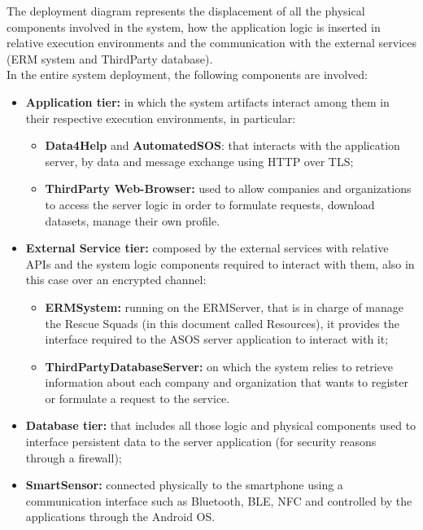 \begin{flushleft}
\newpage
{}
The deployment diagram represents the displacement of all the physical components involved in the system, how the application logic is inserted in relative execution environments and the communication with the external services (ERM system and ThirdParty database). \\
In the entire system deployment, the following components are involved:
\begin{itemize}
	\item \textbf{Application tier:} in which the system artifacts interact among them in their respective execution environments, in particular:
	\begin{itemize}
		\item \textbf{Data4Help} and \textbf{AutomatedSOS}: that interacts with the application server, by data and message exchange using HTTP over TLS;
		\item \textbf{ThirdParty Web-Browser:} used to allow companies and organizations to access the server logic in order to formulate requests, download datasets, manage their own profile.
	\end{itemize}
	\item \textbf{External Service tier:} composed by the external services with relative APIs and the system logic components required to interact with them, also in this case over an encrypted channel:
	\begin{itemize}
		\item \textbf{ERMSystem:} running on the ERMServer, that is in charge of manage the Rescue Squads (in this document called Resources), it provides the interface required to the ASOS server application to interact with it;
		\item \textbf{ThirdPartyDatabaseServer:} on which the system relies to retrieve information about each company and organization that wants to register or formulate a request to the service.
	\end{itemize}
	\item \textbf{Database tier:} that includes all those logic and physical components used to interface persistent data to the server application (for security reasons through a firewall);
	\item \textbf{SmartSensor:} connected physically to the smartphone using a communication interface such as Bluetooth, BLE, NFC and controlled by the applications through the Android OS.
\end{itemize}


\end{flushleft}
